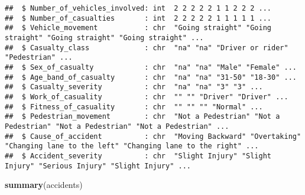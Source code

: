 \documentclass[
]{article}
\newenvironment{Shaded}{\begin{snugshade}}{\end{snugshade}}
\newcommand{\FunctionTok}[1]{\textcolor[rgb]{0.13,0.29,0.53}{\textbf{#1}}}
\newcommand{\NormalTok}[1]{#1}
\begin{document}
\begin{verbatim}
##  $ Number_of_vehicles_involved: int  2 2 2 2 2 1 1 2 2 2 ...
##  $ Number_of_casualties       : int  2 2 2 2 2 1 1 1 1 1 ...
##  $ Vehicle_movement           : chr  "Going straight" "Going straight" "Going straight" "Going straight" ...
##  $ Casualty_class             : chr  "na" "na" "Driver or rider" "Pedestrian" ...
##  $ Sex_of_casualty            : chr  "na" "na" "Male" "Female" ...
##  $ Age_band_of_casualty       : chr  "na" "na" "31-50" "18-30" ...
##  $ Casualty_severity          : chr  "na" "na" "3" "3" ...
##  $ Work_of_casuality          : chr  "" "" "Driver" "Driver" ...
##  $ Fitness_of_casuality       : chr  "" "" "" "Normal" ...
##  $ Pedestrian_movement        : chr  "Not a Pedestrian" "Not a Pedestrian" "Not a Pedestrian" "Not a Pedestrian" ...
##  $ Cause_of_accident          : chr  "Moving Backward" "Overtaking" "Changing lane to the left" "Changing lane to the right" ...
##  $ Accident_severity          : chr  "Slight Injury" "Slight Injury" "Serious Injury" "Slight Injury" ...
\end{verbatim}

\begin{Shaded}
\begin{Highlighting}[]
\FunctionTok{summary}\NormalTok{(accidents)}
\end{Highlighting}
\end{Shaded}
\end{document}
